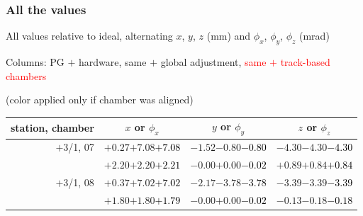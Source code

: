 \documentclass[compress]{beamer}
\begin{document}
\begin{frame}
\frametitle{All the values}
\tiny

All values relative to ideal, alternating $x$, $y$, $z$ (mm) and $\phi_x$, $\phi_y$, $\phi_z$ (mrad)

Columns: PG $+$ hardware, same $+$ global adjustment, \textcolor{red}{same $+$ track-based chambers}

\hfill (color applied only if chamber was aligned)

\vfill
\renewcommand{\arraystretch}{1.1}
\begin{tabular}{r | c | c | c}
station, chamber & $x$ or $\phi_x$ & $y$ or $\phi_y$ & $z$ or $\phi_z$ \\\hline
$+$3/1, 07 & $+0.27$\hspace{0.1 cm}$+7.08$\hspace{0.1 cm}\textcolor{black}{$+7.08$} & $-1.52$\hspace{0.1 cm}$-0.80$\hspace{0.1 cm}\textcolor{black}{$-0.80$} & $-4.30$\hspace{0.1 cm}$-4.30$\hspace{0.1 cm}\textcolor{black}{$-4.30$} \\
           & $+2.20$\hspace{0.1 cm}$+2.20$\hspace{0.1 cm}\textcolor{black}{$+2.21$} & $-0.00$\hspace{0.1 cm}$+0.00$\hspace{0.1 cm}\textcolor{black}{$-0.02$} & $+0.89$\hspace{0.1 cm}$+0.84$\hspace{0.1 cm}\textcolor{black}{$+0.84$} \\
$+$3/1, 08 & $+0.37$\hspace{0.1 cm}$+7.02$\hspace{0.1 cm}\textcolor{black}{$+7.02$} & $-2.17$\hspace{0.1 cm}$-3.78$\hspace{0.1 cm}\textcolor{black}{$-3.78$} & $-3.39$\hspace{0.1 cm}$-3.39$\hspace{0.1 cm}\textcolor{black}{$-3.39$} \\
           & $+1.80$\hspace{0.1 cm}$+1.80$\hspace{0.1 cm}\textcolor{black}{$+1.79$} & $-0.00$\hspace{0.1 cm}$+0.00$\hspace{0.1 cm}\textcolor{black}{$-0.02$} & $-0.13$\hspace{0.1 cm}$-0.18$\hspace{0.1 cm}\textcolor{black}{$-0.18$} \\

\end{tabular}
\end{frame}
\end{document}
